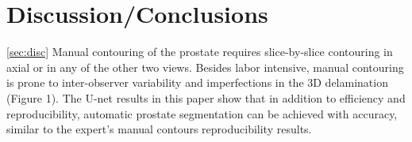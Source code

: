 \section{Discussion/Conclusions}
\ref{sec:disc}
Manual contouring of the prostate requires slice-by-slice contouring 
in axial or in any of the other two views. Besides labor intensive, manual 
contouring is prone to inter-observer variability and imperfections 
in the 3D delamination (Figure 1). The U-net results in this paper show 
that in addition to efficiency and reproducibility, automatic prostate segmentation can be 
achieved with accuracy, similar to the expert’s manual contours reproducibility results. 
